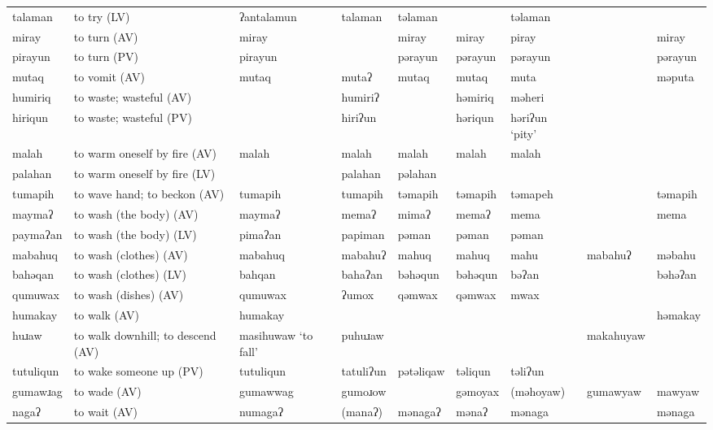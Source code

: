 \begin{landscape}
\begin{longtable}{*{9}{>{\raggedright\arraybackslash}p{}}}
\text{*}talaman      & to try (LV) & ʔantalamun & talaman & təlaman &  & təlaman &  & \\
\text{*}miray        & to turn (AV) & miray &  & miray & miray & piray &  & miray\\
\text{*}pirayun      & to turn (PV) & pirayun &  & pərayun & pərayun & pərayun &  & pərayun\\
\text{*}mutaq        & to vomit (AV) & mutaq & mutaʔ & mutaq & mutaq & muta &  & məputa\\
\text{*}humiriq      & to waste; wasteful (AV) &  & humiriʔ &  & həmiriq & məheri &  & \\
\text{*}hiriqun      & to waste; wasteful (PV) &  & hiriʔun &  & həriqun & həriʔun `pity' &  & \\
\text{*}malah        & to warm oneself by fire (AV) & malah & malah & malah & malah & malah &  & \\
\text{*}palahan      & to warm oneself by fire (LV) &  & palahan & pəlahan &  &  &  & \\
\text{*}tumapih      & to wave hand; to beckon (AV) & tumapih & tumapih & təmapih & təmapih & təmapeh &  & təmapih\\
\text{*}maymaʔ       & to wash (the body) (AV) & maymaʔ & memaʔ & mimaʔ & memaʔ & mema &  & mema\\
\text{*}paymaʔan     & to wash (the body) (LV) & pimaʔan & papiman & pəman & pəman & pəman &  & \\
\text{*}mabahuq      & to wash (clothes) (AV) & mabahuq & mabahuʔ & mahuq & mahuq & mahu & mabahuʔ & məbahu\\
\text{*}bahəqan      & to wash (clothes) (LV) & bahqan & bahaʔan & bəhəqun & bəhəqun & bəʔan &  & bəhəʔan\\
\text{*}qumuwax      & to wash (dishes) (AV) & qumuwax & ʔumox & qəmwax & qəmwax & mwax &  & \\
\text{*}humakay      & to walk (AV) & humakay &  &  &  &  &  & həmakay\\
\text{*}huɹaw       & to walk downhill; to descend (AV) & masihuwaw `to fall' & puhuɹaw &  &  &  & makahuyaw & \\
\text{*}tutuliqun    & to wake someone up (PV) & tutuliqun & tatuliʔun & pətəliqaw & təliqun & təliʔun &  & \\
\text{*}gumawɹag     & to wade (AV) & gumawwag & gumoɹow &  & gəmoyax & (məhoyaw) & gumawyaw & mawyaw\\
\text{*}nagaʔ       & to wait (AV) & numagaʔ & (manaʔ) & mənagaʔ & mənaʔ & mənaga &  & mənaga\\

\end{longtable}
\end{landscape}
